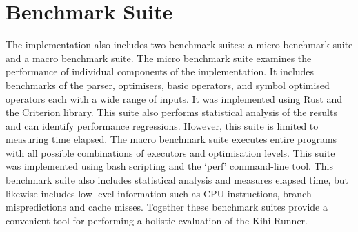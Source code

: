 \section{Benchmark Suite}
The implementation also includes two benchmark suites: a micro benchmark suite and a macro benchmark suite. The micro benchmark suite examines the performance of individual components of the implementation. It includes benchmarks of the parser, optimisers, basic operators, and symbol optimised operators each with a wide range of inputs. It was implemented using Rust and the Criterion library. This suite also performs statistical analysis of the results and can identify performance regressions. However, this suite is limited to measuring time elapsed. The macro benchmark suite executes entire programs with all possible combinations of executors and optimisation levels. This suite was implemented using bash scripting and the `perf' command-line tool. This benchmark suite also includes statistical analysis and measures elapsed time, but likewise includes low level information such as CPU instructions, branch mispredictions and cache misses. Together these benchmark suites provide a convenient tool for performing a holistic evaluation of the Kihi Runner.